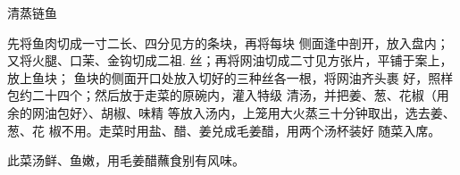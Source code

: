 \begin{recipe}{清蒸链鱼}

\ingredients


\cooking

\step 先将鱼肉切成一寸二长、四分见方的条块，再将每块 侧面逢中剖开，放入盘内；又将火腿、口茉、金钩切成二祖. 丝；再将网油切成二寸见方张片，平铺于案上，放上鱼块； 鱼块的侧面开口处放入切好的三种丝各一根，将网油齐头裹 好，照样包约二十四个；然后放于走菜的原碗内，灌入特级 清汤，并把姜、葱、花椒（用余的网油包好〉、胡椒、味精 等放入汤内，上笼用大火蒸三十分钟取出，选去姜、葱、花 椒不用。走菜时用盐、醋、姜兑成毛姜醋，用两个汤杯装好 随菜入席。

\notes

此菜汤鲜、鱼嫩，用毛姜醋蘸食别有风味。

\end{recipe}

